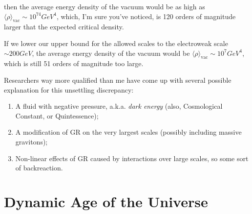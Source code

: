 then the average energy density of the vacuum would be as high as $\langle \rho \rangle_{\text{vac}} \sim 10^{74}\unit{GeV}^{4}$, which, I'm sure you've noticed, is 120 orders of magnitude larger that the expected critical density.
\par If we lower our upper bound for the allowed scales to the electroweak scale $\sim 200\unit{GeV}$, the average energy density of the vacuum would be $\langle \rho \rangle_{\text{vac}} \sim 10^{7}\unit{GeV}^{4}$, which is still 51 orders of magnitude too large.
\par Researchers way more qualified than me have come up with several possible explanation for this unsettling discrepancy:
\begin{enumerate}
    \item A fluid with negative pressure, a.k.a. \emph{dark energy} (also, Cosmological Constant, or Quintessence);
    \item A modification of GR on the very largest scales (possibly including massive gravitons);
    \item Non-linear effects of GR caused by interactions over large scales, so some sort of backreaction.
\end{enumerate}

\section{Dynamic Age of the Universe}

